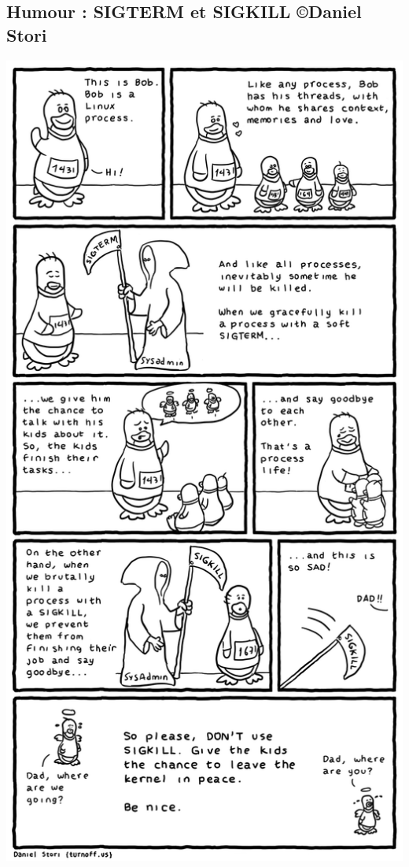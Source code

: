 \documentclass[10pt,french,A4]{article}
\theoremstyle{plain}
\begin{document}
\subsection*{Humour :  SIGTERM et SIGKILL ©Daniel Stori}
\begin{center}
    \includegraphics[width=0.75\linewidth]{dont-sigkill}
\end{center}
\end{document}
